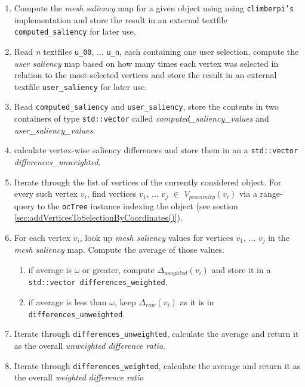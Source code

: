 \begin{enumerate}
	\item Compute the \textit{mesh saliency} map for a given object using using \texttt{climberpi's} implementation \cite{clms} and store the result in an external textfile \texttt{computed\_saliency} for later use.
	\item Read \textit{n} textfiles \texttt{u\_00}, ... \texttt{u\_n}, each containing one user selection, compute the \textit{user saliency} map based on how many times each vertex was selected in relation to the most-selected vertices and store the result in an external textfile \texttt{user\_saliency} for later use.
	\item Read \texttt{computed\_saliency} and \texttt{user\_saliency}, store the contents in two containers of type \texttt{std::vector} called \textit{computed\_saliency\_values} and \textit{user\_saliency\_values}.
	\item calculate vertex-wise saliency differences and store them in an a \texttt{std::vector} \textit{differences\_unweighted}.
	\item Iterate through the list of vertices of the currently considered object. For every such vertex $v_i$, find vertices $v_1$, ... $v_j$ $\in$ $V_{proximity}(v_i)$ via a range-query to the \texttt{ocTree} instance indexing the object (see section \ref{sec:addVerticesToSelectionByCoordinates()}).
	\item For each vertex $v_i$, look up \textit{mesh saliency} values for vertices $v_1$, ... $v_j$ in the \textit{mesh saliency} map. Compute the average of those values.
	\begin{enumerate}
		\item if average is $\omega$ or greater, compute $\Delta_{weighted}(v_i)$ and store it in a \texttt{std::vector differences\_weighted}.
		\item if average is less than $\omega$, keep $\Delta_{raw}(v_i)$ as it is in \texttt{differences\_unweighted}.
	\end{enumerate}
	\item Iterate through \texttt{differences\_unweighted}, calculate the average and return it as the overall \textit{unweighted difference ratio}.
	\item Iterate through \texttt{differences\_weighted}, calculate the average and return it as the overall \textit{weighted difference ratio}
\end{enumerate}

